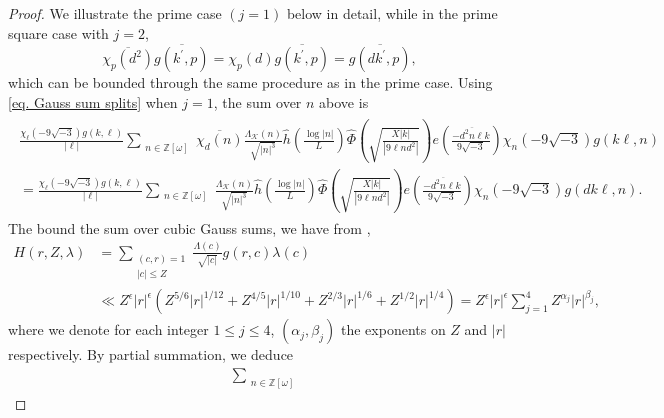 \documentclass[11pt]{amsart}
\def\n{\mathfrak{n}}
\numberwithin{equation}{section}
\newcommand{\mymod}[1]{(\operatorname{mod} #1)}
\theoremstyle{remark}
\begin{document}
\begin{proof}
We illustrate the prime case $(j=1)$ below in detail, while in the prime square case with $j=2$, 
$$\overline{\chi_p(d^2)} \overline{g(k^\prime, p)}
=\chi_p(d)\overline{g(k^\prime, p)}
=\overline{g(dk^\prime, p)},$$ 
which can be bounded through the same procedure as in the prime case. Using \eqref{eq. Gauss sum splits} when $j=1$,
the sum over $n$ above is
\begin{align}
\label{eq. partial S_2 error}
\begin{split}
    \frac{\chi_\ell(-9\sqrt{-3})g(k, \ell)}{|\ell|}
    \sum_{\substack{n\in \mathbb{Z}[\omega]}} \overline{\chi_{d}( n)}\frac{\Lambda_\mathcal{K}(n)}{\sqrt{|n|^3}}
	\hat{h}\left(\frac{\log |n|}{L}\right)
	\widehat{\Phi}\left(\sqrt{\frac{X|k|}{|9{\ell n}d^2|}}\right)
    e\left(\frac{-\overline{d^2n\ell}k}{9\sqrt{-3}}\right)
    \chi_{n}(-9\sqrt{-3})
    g(k\ell, n) 
    \\
    =
    \frac{\chi_\ell(-9\sqrt{-3})g(k, \ell)}{|\ell|}
    \sum_{\substack{n\in \mathbb{Z}[\omega]\\}} \frac{\Lambda_\mathcal{K}(n)}{\sqrt{|n|^3}}
	\hat{h}\left(\frac{\log |n|}{L}\right)
	\widehat{\Phi}\left(\sqrt{\frac{X|k|}{|9{\ell n}d^2|}}\right)
    e\left(\frac{-\overline{d^2n\ell}k}{9\sqrt{-3}}\right)
    \chi_{n}(-9\sqrt{-3})
    g(dk\ell, n).
    \end{split}
\end{align}
The bound the sum over cubic Gauss sums, we have from \cite[Theorem 4.4]{DG},
\begin{align*}
	H(r, Z, \lambda)
    &=
    \sum_{\substack{(c, r)=1\\
    |c|\le Z}}\frac{\Lambda(c)}{\sqrt{|c|}}g(r, c)\lambda(c)
    \\
	&\ll
	Z^\epsilon|r|^\epsilon\left(Z^{5/6}|r|^{1/12}+Z^{4/5}|r|^{1/10} +Z^{2/3}|r|^{1/6} + Z^{1/2}|r|^{1/4} \right)
    =Z^\epsilon|r|^\epsilon 
    \sum_{j=1}^4 Z^{\alpha_j}|r|^{\beta_j},
\end{align*}
where we denote for each integer $1\le j\le 4$, $(\alpha_j, \beta_j)$ the exponents on $Z$ and $|r|$ respectively.
By partial summation, we deduce
\begin{align*}
	&\sum_{\substack{n\in \mathbb{Z}[\omega]
}}
\end{align*}
\end{proof}
\end{document}
